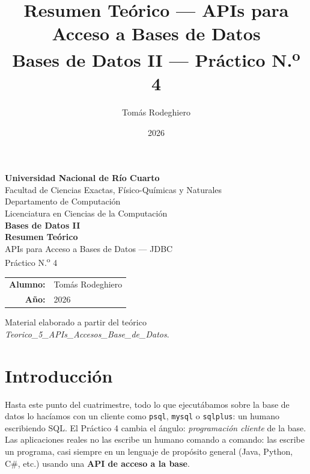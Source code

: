 \documentclass[11pt,a4paper]{article}
\title{Resumen Teórico --- APIs para Acceso a Bases de Datos\\[4pt]
       \large Bases de Datos II --- Práctico N.\textsuperscript{o} 4}
\author{Tomás Rodeghiero}
\date{2026}
\begin{document}
\begin{titlepage}
    \centering
    \vspace*{1.5cm}

    {\large \textbf{Universidad Nacional de Río Cuarto}}\\[6pt]
    {\normalsize Facultad de Ciencias Exactas, Físico-Químicas y Naturales}\\[4pt]
    {\normalsize Departamento de Computación}\\[4pt]
    {\normalsize Licenciatura en Ciencias de la Computación}\\[3cm]

    {\Large \textbf{Bases de Datos II}}\\[1.2cm]

    {\Large \textbf{Resumen Teórico}}\\[6pt]
    {\large APIs para Acceso a Bases de Datos --- JDBC\\[2pt]
    Práctico N.\textsuperscript{o} 4}\\[3cm]

    \begin{tabular}{rl}
        \textbf{Alumno:} & Tomás Rodeghiero \\[4pt]
        \textbf{Año:}    & 2026 \\
    \end{tabular}

    \vfill
    {\small Material elaborado a partir del teórico
    \emph{Teorico\_5\_APIs\_Accesos\_Base\_de\_Datos}.}
\end{titlepage}

\tableofcontents
\newpage

\section{Introducción}

Hasta este punto del cuatrimestre, todo lo que ejecutábamos sobre la
base de datos lo hacíamos con un cliente como \texttt{psql},
\texttt{mysql} o \texttt{sqlplus}: un humano escribiendo SQL.
El Práctico 4 cambia el ángulo: \emph{programación cliente} de la
base. Las aplicaciones reales no las escribe un humano comando a
comando: las escribe un programa, casi siempre en un lenguaje de
propósito general (Java, Python, C\#, etc.) usando una \textbf{API de
acceso a la base}.
\end{document}

